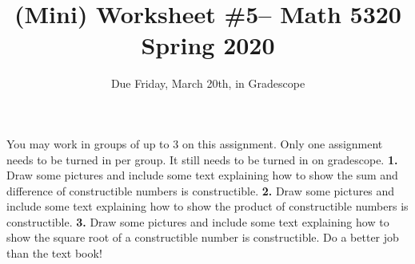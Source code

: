 \documentclass[10pt]{amsart}
\theoremstyle{theorem}
\begin{document}
\title{(Mini) Worksheet \#5-- Math 5320\\Spring 2020}
\author{Due Friday, March 20th, in Gradescope}

\maketitle
You may work in groups of up to 3 on this assignment.  Only one assignment needs to be turned in per group.  It still needs to be turned in on gradescope.  
\vskip 3pt
\noindent
{\bf 1.}  Draw some pictures and include some text explaining how to show the sum and difference of constructible numbers is constructible.  
\newpage
\noindent
{\bf 2.}  Draw some pictures and  include some text explaining how to show the product of constructible numbers is constructible.  
\noindent
\newpage
{\bf 3.}  Draw some pictures and include some text explaining how to show the square root of a constructible number is constructible.  Do a better job than the text book!
\end{document}
